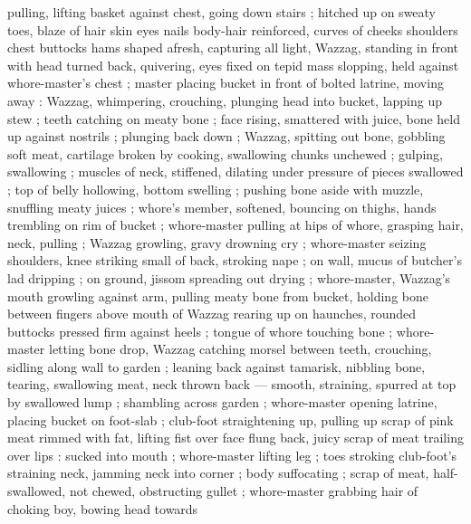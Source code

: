 pulling, lifting basket against chest, going down stairs ; hitched up on sweaty toes, blaze of hair skin eyes nails body-hair reinforced, curves of cheeks shoulders chest buttocks hams shaped afresh, capturing all light, Wazzag, standing in front with head turned back, quivering, eyes fixed on tepid mass slopping, held against whore-master's chest ; master placing bucket in front of bolted latrine, moving away : Wazzag, whimpering, crouching, plunging head into bucket, lapping up stew ; teeth catching on meaty bone ; face rising, smattered with juice, bone held up against nostrils ; plunging back down ; Wazzag, spitting out bone, gobbling soft meat, cartilage broken by cooking, swallowing chunks unchewed ; gulping, swallowing ; muscles of neck, stiffened, dilating under pressure of pieces swallowed ; top of belly hollowing, bottom swelling ; pushing bone aside with muzzle, snuffling meaty juices ; whore's member, softened, bouncing on thighs, hands trembling on rim of bucket ; whore-master pulling at hips of whore, grasping hair, neck, pulling ; Wazzag growling, gravy drowning cry ; whore-master seizing shoulders, knee striking small of back, stroking nape ; on wall, mucus of butcher's lad dripping ; on ground, jissom spreading out drying ; whore-master, Wazzag's mouth growling against arm, pulling meaty bone from bucket, holding bone between fingers above mouth of Wazzag rearing up on haunches, rounded buttocks pressed firm against heels ; tongue of whore touching bone ; whore-master letting bone drop, Wazzag catching morsel between teeth, crouching, sidling along wall to garden ; leaning back against tamarisk, nibbling bone, tearing, swallowing meat, neck thrown back --- smooth, straining, spurred at top by swallowed lump ; shambling across garden ; whore-master opening latrine, placing bucket on foot-slab ; club-foot straightening up, pulling up scrap of pink meat rimmed with fat, lifting fist over face flung back, juicy scrap of meat trailing over lips : sucked into mouth ; whore-master lifting leg ; toes stroking club-foot's straining neck, jamming neck into corner ; body suffocating ; scrap of meat, half-swallowed, not chewed, obstructing gullet ; whore-master grabbing hair of choking boy, bowing head towards 
